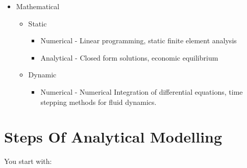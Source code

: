 \documentclass[11pt]{report}
\begin{document}
\begin{enumerate}
\begin{itemize}
\item Mathematical

\begin{itemize}
\item Static

\begin{itemize}
\item Numerical - Linear programming, static finite element analysis

\item Analytical - Closed form solutions, economic equilibrium
\end{itemize}

\item Dynamic

\begin{itemize}
\item Numerical - Numerical Integration of differential equations, time
stepping methods for fluid dynamics.
\end{itemize}
\end{itemize}
\end{itemize}
\end{enumerate}
\section{Steps Of Analytical Modelling}
\label{steps-of-analytical-modelling}
You start with:
\end{document}
